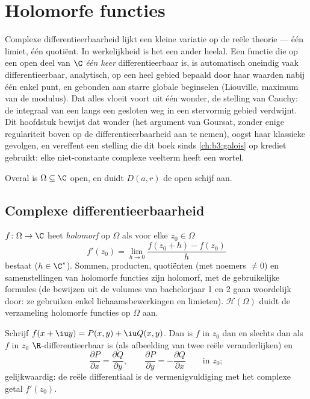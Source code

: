 \chapter{Holomorfe functies}\label{ch:b3:holomorphic}

Complexe differentieerbaarheid lijkt een kleine variatie op de
reële theorie --- één limiet, één quotiënt. In werkelijkheid is
het een ander heelal. Een functie die op een open deel van $\C$
\emph{één keer} differentieerbaar is, is automatisch oneindig
vaak differentieerbaar, analytisch, op een heel gebied bepaald
door haar waarden nabij één enkel punt, en gebonden aan starre
globale beginselen (Liouville, maximum van de modulus). Dat alles
vloeit voort uit één wonder, de stelling van Cauchy: de integraal
van een  langs een gesloten weg in een stervormig
gebied verdwijnt. Dit hoofdstuk bewijst dat wonder (het argument
van Goursat, zonder enige regulariteit boven op de
differentieerbaarheid aan te nemen), oogst haar klassieke
gevolgen, en vereffent een stelling die dit boek sinds
\cref{ch:b3:galois} op krediet gebruikt: elke niet-constante
complexe veelterm heeft een wortel.

Overal is $\Omega \subseteq \C$ open, en duidt $D(a, r)$ de open
schijf aan.

\section{Complexe differentieerbaarheid}

\begin{definition}\label{def:b3:holomorphic:holo}
$f \colon \Omega \to \C$ heet \emph{holomorf} op $\Omega$ als voor elke $z_0 \in \Omega$
\[
f'(z_0) = \lim_{h\to0}\frac{f(z_0 + h) - f(z_0)}{h}
\]
bestaat ($h \in \C^*$). Sommen, producten, quotiënten (met
noemers $\neq 0$) en samenstellingen van holomorfe functies zijn
holomorf, met de gebruikelijke formules (de bewijzen uit de
volumes van bachelorjaar 1 en 2 gaan woordelijk door: ze
gebruiken enkel lichaamsbewerkingen en limieten). $\mathcal
H(\Omega)$ duidt de verzameling holomorfe functies op $\Omega$
aan.
\end{definition}

\begin{proposition}
\label{prop:b3:holomorphic:cauchyriemann}
Schrijf $f(x + \iu y) = P(x,y) + \iu Q(x,y)$. Dan is $f$
 in $z_0$ dan en slechts dan als $f$ in $z_0$
$\R$-differentieerbaar is (als afbeelding van twee reële
veranderlijken) en
\[
\frac{\partial P}{\partial x} = \frac{\partial Q}{\partial y},
\qquad
\frac{\partial P}{\partial y} = -\frac{\partial Q}{\partial x}
\qquad \text{in } z_0 ;
\]
gelijkwaardig: de reële differentiaal is de vermenigvuldiging met
het complexe getal $f'(z_0)$.
\end{proposition}

